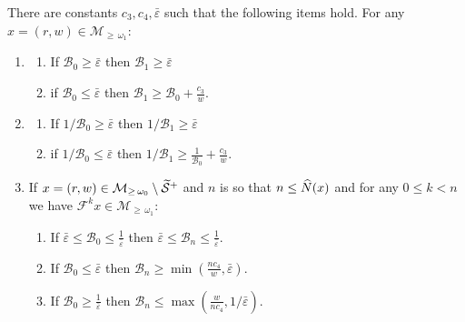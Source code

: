 \documentclass[AHL, Unicode, longabstracts,published]{cedram}
\newcommand{\ct}{r}
\newcommand{\ifrac}[2]{#1/#2}
\newcommand{\cB}{\mathcal{B}}
\newcommand{\pslope}{\mathcal{B}}
\newcommand{\cm}{\mathcal{F}}
\newcommand{\csp}{\mathcal{M}}
\newcommand{\cspl}[1]{\csp_{\ge\,#1}}
\newcommand{\breps}{\bar{\varepsilon}}
\newcommand{\ppPrivate}[2]{#1^{#2}}
\newcommand{\prePrivate}[1]{\ppPrivate{#1}{-}}
\newcommand{\prpslope}{\prePrivate{\pslope}}
\newcommand{\singPrivate}{\mathcal{S}}
\newcommand{\singt}[1]{\tilde{\singPrivate}^{#1}}
\newcommand{\llw}{\stackunder[1.2pt]{$w$}{\rule{.8ex}{.075ex}}}
\newcommand{\law}[1]{\omega_{#1}}
\newcommand{\Np}{\hat N}
\renewcommand{\prpslope}{\cB}
\renewcommand{\llw}{\law{1}}
\renewcommand{\prpslope}{\cB}
\renewcommand{\prpslope}{\cB}
\newcommand*{\relabel}{\renewcommand{\labelenumi}{(\theenumi)}}
\newcommand*{\relabell}{\renewcommand{\labelenumii}{(\theenumii)}}
\newcommand*{\romanenumii}{\renewcommand*{\theenumii}{\roman{enumii}}\relabell}
\newcommand*{\alphenumi}{\renewcommand*{\theenumi}{\alph{enumi}}\relabel}
\let\oldtilde\tilde
\renewcommand*{\tilde}[1]{\mathchoice{\widetilde{#1}}{\widetilde{#1}}{\oldtilde{#1}}{\oldtilde{#1}}}
\let\oldhat\hat
\renewcommand*{\hat}[1]{\mathchoice{\widehat{#1}}{\widehat{#1}}{\oldhat{#1}}{\oldhat{#1}}}
\begin{document}
\begin{lemm}\label{LmPSlopeHighEnergy}
There are constants $c_3, c_{4}, \breps$ such that the following items hold. For any $x = (\ct,w)\in\cspl{\llw}$:
\begin{enumerate}\alphenumi
\item\label{i_highEnergyBelow}
\begin{enumerate}\romanenumii
\item\label{lemm4.13.a.1} If $\prpslope_{0}\geq \breps$ then $\prpslope_{1}\geq \breps$
\item\label{lemm4.13.a.2} if $\prpslope_{0}\leq \breps$ then $\prpslope_{1}\geq \prpslope_{0}+\frac{c_3}{w}. $
\end{enumerate}
\item\label{i_highEnergyAbove}
\begin{enumerate}\romanenumii
\item\label{lemm4.13.b.1} If $\ifrac{1}{\prpslope_{0}} \geq \breps$ then $\ifrac{1}{\prpslope_{1}}\geq \breps$
\item\label{lemm4.13.b.2} if $\ifrac{1}{\prpslope_{0}}\leq \breps$ then $\ifrac{1}{\prpslope_{1}}\geq
\frac{1}{\prpslope_{0}}+\frac{c_3}{w}$.
\end{enumerate}
\item\label{i_highEnergySqueeze}
If $x = (\ct,w)\in\cspl{\law{0}}\setminus\singt+$ and $n$ is so that $n\leq \Np(x)$ and for any $0\le k < n$ we have $\cm^{k}x\in\cspl{\llw}$:
\begin{enumerate}\romanenumii
\item\label{lemm4.13.c.1} If $\breps\leq \prpslope_0\leq \frac{1}{\breps}$ then $\breps\leq \prpslope_n\leq \frac{1}{\breps}$.
\item\label{lemm4.13.c.2} If $\prpslope_0\le\breps$ then $\prpslope_n\geq \min(\frac{n c_4}{w}, \breps)$.
\item\label{lemm4.13.c.3} If $\prpslope_0\geq \frac{1 }{\breps}$ then $\prpslope_n\leq \max(\frac{w}{n c_4}, 1/\breps)$.
\end{enumerate}
\end{enumerate}
\end{lemm}
\end{document}
